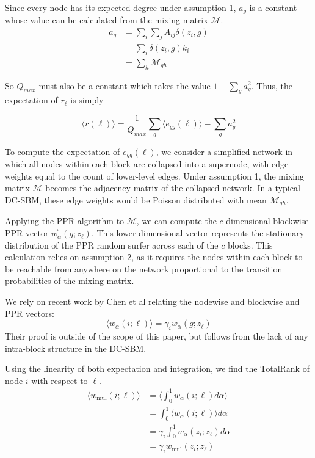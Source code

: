 \documentclass[12pt]{article}
\begin{document}
Since every node has its expected degree under assumption 1,  $a_g$ is a constant whose value can be calculated from the mixing matrix $\mathcal{M}$.
\begin{equation}
  \begin{aligned}
    a_g &= \sum_i \sum_j A_{ij} \delta(z_i, g) \\ 
    &= \sum_i \delta(z_i, g) k_i \\
    &= \sum_h \mathcal{M}_{gh}
  \end{aligned}
\end{equation}

So $Q_{max}$ must also be a constant which takes the value $1 - \sum_g a_g^2$.  Thus, the expectation of $r_\ell$ is simply

\begin{equation}
  \langle r(\ell) \rangle = \frac{1}{Q_{max}} \sum_g \langle e_{gg}(\ell) \rangle - \sum_g a_g^2
\end{equation}

To compute the expectation of $e_{gg}(\ell)$, we consider a simplified network in which all nodes within each block are collapsed into a supernode, with edge weights equal to the count of lower-level edges.  Under assumption 1, the mixing matrix $\mathcal{M}$ becomes the adjacency matrix of the collapsed network.  In a typical DC-SBM, these edge weights would be Poisson distributed with mean $\mathcal{M}_{gh}$.

Applying the PPR algorithm to $\mathcal{M}$, we can compute the $c$-dimensional blockwise PPR vector $\vec{w}_\alpha(g; z_\ell)$.  This lower-dimensional vector represents the stationary distribution of the PPR random surfer across each of the $c$ blocks.  This calculation relies on assumption 2, as it requires the nodes within each block to be reachable from anywhere on the network proportional to the transition probabilities of the mixing matrix.

We rely on recent work by Chen et al \cite{chen:2020} relating the nodewise and blockwise and PPR vectors:
\begin{equation}
  \langle w_\alpha (i ; \ell) \rangle = \gamma_i w_\alpha(g; z_\ell)
\end{equation}
Their proof is outside of the scope of this paper, but follows from the lack of any intra-block structure in the DC-SBM.

Using the linearity of both expectation and integration, we find the TotalRank \cite{boldi:2005} \cite{Peel:2018} of node $i$ with respect to $\ell$.
\begin{equation}
  \begin{aligned}
    \langle w_\text{mul} (i ; \ell) \rangle &= \big \langle \int_0^1 w_\alpha(i; \ell) d\alpha \big \rangle \\
    &= \int_0^1 \langle w_\alpha(i; \ell) \rangle d\alpha \\
    &= \gamma_i \int_0^1 w_\alpha(z_i; z_\ell) d\alpha \\
    &= \gamma_i w_\text{mul}(z_i;z_\ell)
  \end{aligned}
\end{equation}
\end{document}
